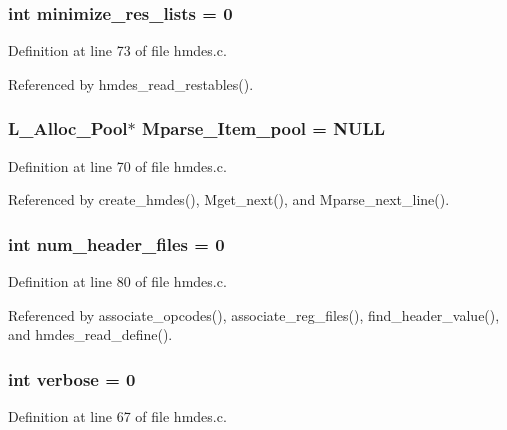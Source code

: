 \subsubsection{\setlength{\rightskip}{0pt plus 5cm}int \bf{minimize\_\-res\_\-lists} = 0}\label{hmdes_8c_1e78704d5e8ec4618d699113578f6ac7}




Definition at line 73 of file hmdes.c.

Referenced by hmdes\_\-read\_\-restables().
\subsubsection{\setlength{\rightskip}{0pt plus 5cm}\bf{L\_\-Alloc\_\-Pool}$\ast$ \bf{Mparse\_\-Item\_\-pool} = \bf{NULL}\hspace{0.3cm}{\tt  [static]}}\label{hmdes_8c_c7dbbbf62127c82c8f72ef0aafab14ab}




Definition at line 70 of file hmdes.c.

Referenced by create\_\-hmdes(), Mget\_\-next(), and Mparse\_\-next\_\-line().
\subsubsection{\setlength{\rightskip}{0pt plus 5cm}int \bf{num\_\-header\_\-files} = 0}\label{hmdes_8c_1771c66351c3c7fd849af851b3e31455}




Definition at line 80 of file hmdes.c.

Referenced by associate\_\-opcodes(), associate\_\-reg\_\-files(), find\_\-header\_\-value(), and hmdes\_\-read\_\-define().
\subsubsection{\setlength{\rightskip}{0pt plus 5cm}int \bf{verbose} = 0}\label{hmdes_8c_0b2caeb4b6f130be43e5a2f0267dd453}




Definition at line 67 of file hmdes.c.